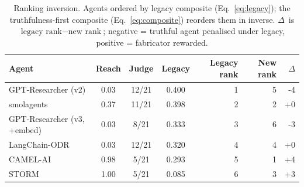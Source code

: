 \begin{table}[ht]
\centering
\caption{Ranking inversion. Agents ordered by legacy composite (Eq.~\ref{eq:legacy}); the truthfulness-first composite (Eq.~\ref{eq:composite}) reorders them in inverse. $\Delta$~is $\text{legacy rank} - \text{new rank}$; negative = truthful agent penalised under legacy, positive = fabricator rewarded.}
\label{tab:inversion}
\begin{tabular}{lcccrrr}
\toprule
Agent & Reach & Judge & Legacy & Legacy rank & New rank & $\Delta$ \\
\midrule
GPT-Researcher (v2) & 0.03 & 12/21 & 0.400 & 1 & 5 & \cellcolor{green!15}-4 \\
smolagents & 0.37 & 11/21 & 0.398 & 2 & 2 & +0 \\
GPT-Researcher (v3, +embed) & 0.03 & 8/21 & 0.333 & 3 & 6 & \cellcolor{green!15}-3 \\
LangChain-ODR & 0.03 & 12/21 & 0.320 & 4 & 4 & +0 \\
CAMEL-AI & 0.98 & 5/21 & 0.293 & 5 & 1 & \cellcolor{red!15}+4 \\
STORM & 1.00 & 5/21 & 0.085 & 6 & 3 & \cellcolor{red!15}+3 \\
\bottomrule
\end{tabular}
\end{table}